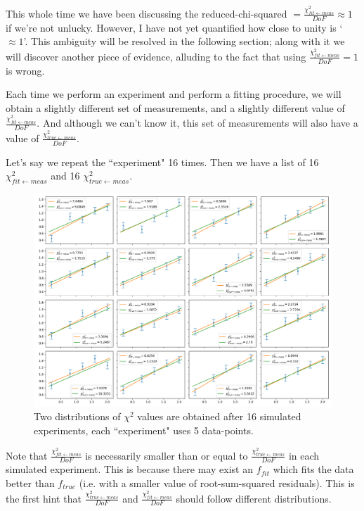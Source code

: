 \documentclass[a4paper, 12pt]{article}
\newcommand{\chifit}{\frac{\chi^2_{fit\leftarrow meas}}{DoF} }
\newcommand{\chitrue}{\frac{\chi^2_{true\leftarrow meas}}{DoF}}
\begin{document}
This whole time we have been discussing the reduced-chi-squared $=\chifit \approx 1$ if we're not unlucky.
However, I have not yet quantified how close to unity is `$\approx 1$'. This ambiguity will be resolved in the following section; along with it we will discover another piece of evidence, alluding to the fact that using $\chifit=1$ is wrong.

Each time we perform an experiment and perform a fitting procedure, we will obtain a slightly different set of measurements, and a slightly different value of $\chifit$. And although we can't know it, this set of measurements will also have a value of $\chitrue$.

Let's say we repeat the ``experiment" 16 times. Then we have a list of 16 $\chi^2_{fit\leftarrow meas}$ and 16 $\chi^2_{true\leftarrow meas}$.

\begin{figure}[H]
\centering
\includegraphics[width=1.1\textwidth]{Ensemble_of_linregress.png} %
\caption{Two distributions of $\chi^2$ values are obtained after 16 simulated experiments, each ``experiment" uses 5 data-points.} \label{Ensemble_of_linregress}
\end{figure}

Note that $\chifit$ is necessarily smaller than or equal to $\chitrue$ in each simulated experiment. This is because there may exist an $f_{fit}$ which fits the data better than $f_{true}$ (i.e. with a smaller value of root-sum-squared residuals). This is the first hint that $\chitrue$ and $\chifit$ should follow different distributions.
\end{document}
